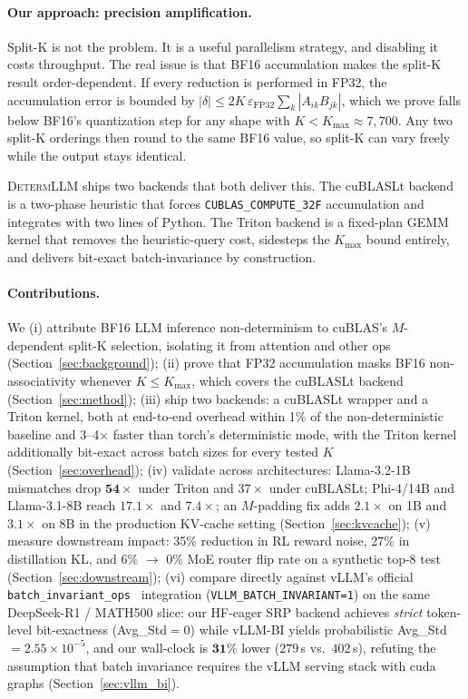 \documentclass{article}
\newcommand{\dllm}{\textsc{DetermLLM}\xspace}
\begin{document}
\paragraph{Our approach: precision amplification.}
Split-K is not the problem. It is a useful parallelism strategy, and disabling it
costs throughput. The real issue is that BF16 accumulation makes the split-K result
order-dependent. If every reduction is performed in FP32, the accumulation error is
bounded by $|\delta|\le 2K\,\varepsilon_{\mathrm{FP32}}\sum_k|A_{ik}B_{jk}|$, which
we prove falls below BF16's quantization step for any shape with
$K<K_{\max}\approx7{,}700$. Any two split-K orderings then round to the same BF16
value, so split-K can vary freely while the output stays identical.

\dllm ships two backends that both deliver this. The cuBLASLt backend is a
two-phase heuristic that forces \texttt{CUBLAS\_COMPUTE\_32F} accumulation and
integrates with two lines of Python. The Triton backend is a fixed-plan GEMM
kernel that removes the heuristic-query cost, sidesteps the $K_{\max}$ bound
entirely, and delivers bit-exact batch-invariance by construction.

\paragraph{Contributions.}
We (i) attribute BF16 LLM inference non-determinism to cuBLAS's $M$-dependent
split-K selection, isolating it from attention and other ops
(Section~\ref{sec:background});
(ii) prove that FP32 accumulation masks BF16 non-associativity whenever
$K\!\le\!K_{\max}$, which covers the cuBLASLt backend
(Section~\ref{sec:method});
(iii) ship two backends: a cuBLASLt wrapper and a Triton kernel, both at
end-to-end overhead within 1\% of the non-deterministic baseline and
3--4$\times$ faster than torch's deterministic mode, with the Triton kernel
additionally bit-exact across batch sizes for every tested $K$
(Section~\ref{sec:overhead});
(iv) validate across architectures: Llama-3.2-1B mismatches drop
$\mathbf{54\times}$ under Triton and $37\times$ under cuBLASLt; Phi-4/14B and
Llama-3.1-8B reach $17.1\times$ and $7.4\times$; an $M$-padding fix adds
$2.1\times$ on 1B and $3.1\times$ on 8B in the production KV-cache setting
(Section~\ref{sec:kvcache});
(v) measure downstream impact: 35\% reduction in RL reward noise, 27\% in
distillation KL, and 6\% $\to$ 0\% MoE router flip rate on a synthetic
top-8 test (Section~\ref{sec:downstream});
(vi) compare directly against vLLM's official
\texttt{batch\_invariant\_ops}~\citep{batchinvariantops2024} integration
(\texttt{VLLM\_BATCH\_INVARIANT=1}) on the same DeepSeek-R1 / MATH500 slice:
our HF-eager SRP backend achieves \emph{strict} token-level bit-exactness
(Avg\_Std$=0$) while vLLM-BI yields probabilistic Avg\_Std$=2.55\!\times\!10^{-5}$,
and our wall-clock is $\mathbf{31\%}$ lower ($279$\,s vs.\ $402$\,s),
refuting the assumption that batch invariance requires the vLLM serving
stack with cuda graphs (Section~\ref{sec:vllm_bi}).
\end{document}
